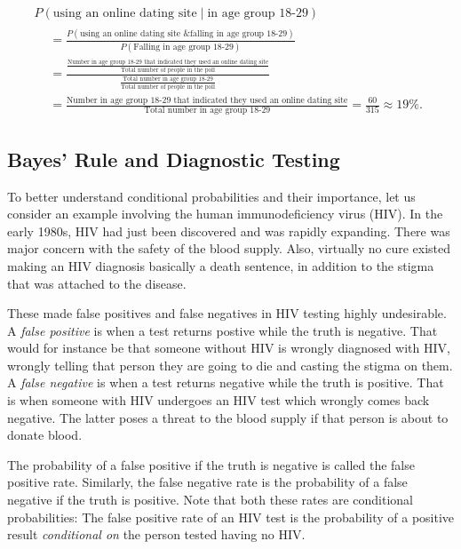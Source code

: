 \documentclass[]{book}
\theoremstyle{definition}
\theoremstyle{definition}
\theoremstyle{remark}
\begin{document}
\begin{multline*}
    P(\text{using an online dating site} \mid \text{in age group 18-29}) \\
\begin{split}
    &= \frac{P(\text{using an online dating site \& falling in age group 18-29})}{P(\text{Falling in age group 18-29})} \\
    &= \frac{\frac{\text{Number in age group 18-29 that indicated they used an online dating site}}{\text{Total number of people in the poll}}}{\frac{\text{Total number in age group 18-29}}{\text{Total number of people in the poll}}} \\
    &= \frac{\text{Number in age group 18-29 that indicated they used an online dating site}}{\text{Total number in age group 18-29}} = \frac{60}{315} \approx 19\%.
\end{split}
\end{multline*}

\subsection{Bayes' Rule and Diagnostic
Testing}\label{diagnostic-testing}

To better understand conditional probabilities and their importance, let
us consider an example involving the human immunodeficiency virus (HIV).
In the early 1980s, HIV had just been discovered and was rapidly
expanding. There was major concern with the safety of the blood supply.
Also, virtually no cure existed making an HIV diagnosis basically a
death sentence, in addition to the stigma that was attached to the
disease.

These made false positives and false negatives in HIV testing highly
undesirable. A \emph{false positive} is when a test returns postive
while the truth is negative. That would for instance be that someone
without HIV is wrongly diagnosed with HIV, wrongly telling that person
they are going to die and casting the stigma on them. A \emph{false
negative} is when a test returns negative while the truth is positive.
That is when someone with HIV undergoes an HIV test which wrongly comes
back negative. The latter poses a threat to the blood supply if that
person is about to donate blood.

The probability of a false positive if the truth is negative is called
the false positive rate. Similarly, the false negative rate is the
probability of a false negative if the truth is positive. Note that both
these rates are conditional probabilities: The false positive rate of an
HIV test is the probability of a positive result \emph{conditional on}
the person tested having no HIV.
\end{document}
